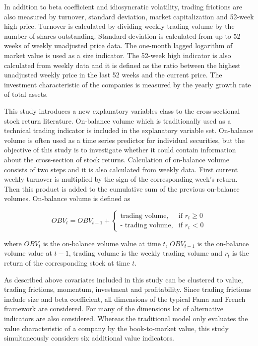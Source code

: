 \documentclass[12pt]{article}
\begin{document}

In addition to beta coefficient and idiosyncratic volatility, trading frictions are also measured by turnover, standard deviation, market capitalization and 52-week high price. Turnover is calculated by dividing weekly trading volume by the number of shares outstanding. Standard deviation is calculated from up to 52 weeks of weekly unadjusted price data. The one-month lagged logarithm of market value is used as a size indicator. The 52-week high indicator is also calculated from weekly data and it is defined as the ratio between the highest unadjusted weekly price in the last 52 weeks and the current price. The investment characteristic of the companies is measured by the yearly growth rate of total assets. \par

This study introduces a new explanatory variables class to the cross-sectional stock return literature. On-balance volume which is traditionally used as a technical trading indicator is included in the explanatory variable set. On-balance volume is often used as a time series predictor for individual securities, but the objective of this study is to investigate whether it could contain information about the cross-section of stock returns. Calculation of on-balance volume consists of two steps and it is also calculated from weekly data. First current weekly turnover is multiplied by the sign of the corresponding week's return. Then this product is added to the cumulative sum of the previous on-balance volumes. On-balance volume is defined as \par

\begin{equation}
\label{eq:OBV}
OBV_t = OBV_{t-1} + 
\begin{cases}
    \text{trading volume}, 	& \text{if $r_t$} \geq \text{0}\\
    \text{- trading volume},	& \text{if $r_t$ < 0}
\end{cases}
\end{equation}

where $OBV_t$ is the on-balance volume value at time $t$, $OBV_{t-1}$ is the on-balance volume value at $t-1$, trading volume is the weekly trading volume and $r_t$ is the return of the corresponding stock at time $t$. \par

As described above covariates included in this study can be clustered to value, trading frictions, momentum, investment and profitability. Since trading frictions include size and beta coefficient, all dimensions of the typical Fama and French framework are considered. For many of the dimensions lot of alternative indicators are also considered. Whereas the traditional \citet{FAMA19933} model only evaluates the value characteristic of a company by the book-to-market value, this study simultaneously considers six additional value indicators. \par
\end{document}
